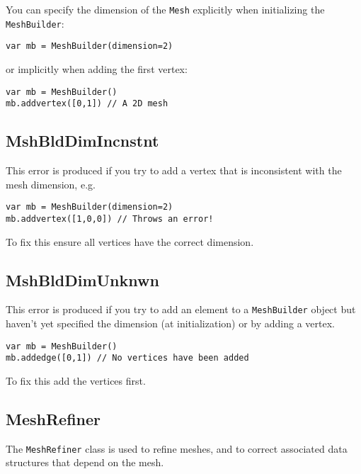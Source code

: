 You can specify the dimension of the \texttt{Mesh} explicitly when
initializing the \texttt{MeshBuilder}:

\begin{lstlisting}
var mb = MeshBuilder(dimension=2)
\end{lstlisting}

or implicitly when adding the first vertex:

\begin{lstlisting}
var mb = MeshBuilder() 
mb.addvertex([0,1]) // A 2D mesh
\end{lstlisting}

\hypertarget{mshblddimincnstnt}{%
\subsection{MshBldDimIncnstnt}\label{mshblddimincnstnt}}

This error is produced if you try to add a vertex that is inconsistent
with the mesh dimension, e.g.

\begin{lstlisting}
var mb = MeshBuilder(dimension=2) 
mb.addvertex([1,0,0]) // Throws an error! 
\end{lstlisting}

To fix this ensure all vertices have the correct dimension.

\hypertarget{mshblddimunknwn}{%
\subsection{MshBldDimUnknwn}\label{mshblddimunknwn}}

This error is produced if you try to add an element to a
\texttt{MeshBuilder} object but haven't yet specified the dimension (at
initialization) or by adding a vertex.

\begin{lstlisting}
var mb = MeshBuilder() 
mb.addedge([0,1]) // No vertices have been added 
\end{lstlisting}

To fix this add the vertices first.

\hypertarget{meshrefiner}{%
\subsection{MeshRefiner}\label{meshrefiner}}

The \texttt{MeshRefiner} class is used to refine meshes, and to correct
associated data structures that depend on the mesh.

